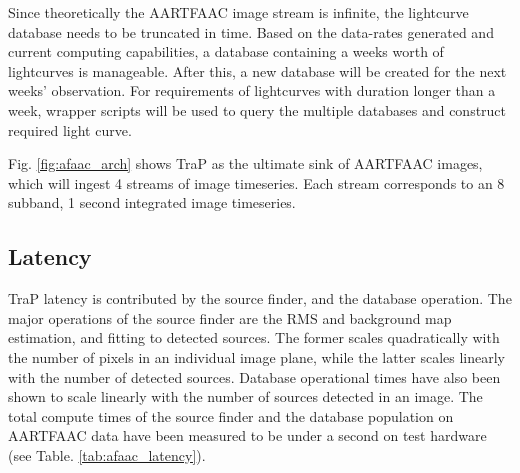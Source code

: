 \documentclass{ws-jai}
\begin{document}
Since  theoretically  the AARTFAAC  image  stream  is infinite,  the  lightcurve
database needs to  be truncated in time.  Based on  the data-rates generated and
current  computing  capabilities,  a  database   containing  a  weeks  worth  of
lightcurves is manageable.   After this, a new database will  be created for the
next weeks'  observation. For requirements  of lightcurves with  duration longer
than a week,  wrapper scripts will be  used to query the  multiple databases and
construct required light curve.

Fig. \ref{fig:afaac_arch}  shows TraP as  the ultimate sink of  AARTFAAC images,
which will ingest 4 streams of image timeseries. Each stream corresponds to an 8
subband, 1 second integrated image timeseries.\\

\subsection {Latency}
TraP  latency   is  contributed   by  the  source   finder,  and   the  database
operation. The major operations of the  source finder are the RMS and background
map estimation, and fitting to detected sources. The former scales quadratically
with the number of pixels in an  individual image plane, while the latter scales
linearly with the  number of detected sources.  Database  operational times have
also been  shown to  scale linearly with  the number of  sources detected  in an
image. The total compute times of  the source finder and the database population
on AARTFAAC data have  been measured to be under a second  on test hardware (see
Table. \ref{tab:afaac_latency}).


\end{document}
